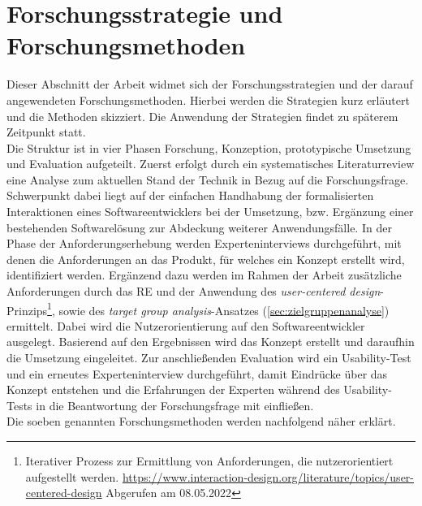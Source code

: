 \section{Forschungsstrategie und Forschungsmethoden}
\label{sec:forschungsstrategie}
    Dieser Abschnitt der Arbeit widmet sich der Forschungsstrategien und der darauf angewendeten Forschungsmethoden. 
    Hierbei werden die Strategien kurz erläutert und die Methoden skizziert. Die Anwendung der Strategien findet zu 
    späterem Zeitpunkt statt. 
    \\
    Die Struktur ist in vier Phasen Forschung, Konzeption, prototypische Umsetzung und Evaluation aufgeteilt. Zuerst erfolgt durch ein 
    systematisches Literaturreview eine Analyse zum aktuellen Stand der Technik in Bezug auf die Forschungsfrage. 
    Schwerpunkt dabei liegt auf der einfachen Handhabung der formalisierten 
    Interaktionen eines Softwareentwicklers bei der Umsetzung, bzw. Ergänzung einer bestehenden 
    Softwarelösung zur Abdeckung weiterer Anwendungsfälle. 
    In der Phase der Anforderungserhebung werden Experteninterviews durchgeführt, mit denen die Anforderungen an das Produkt, 
    für welches ein Konzept erstellt wird, identifiziert werden. Ergänzend dazu werden im Rahmen der Arbeit zusätzliche 
    Anforderungen durch das \ac{RE} und der Anwendung des \textit{user-centered design}-Prinzips\footnote{Iterativer Prozess zur Ermittlung von Anforderungen, die nutzerorientiert aufgestellt werden. \url{https://www.interaction-design.org/literature/topics/user-centered-design} Abgerufen am 08.05.2022}, 
    sowie des \textit{target group analysis}-Ansatzes (\ref{sec:zielgruppenanalyse}) ermittelt. Dabei wird die 
    Nutzerorientierung auf den Softwareentwickler ausgelegt. Basierend auf den Ergebnissen wird das Konzept erstellt und daraufhin die Umsetzung eingeleitet. 
    Zur anschließenden Evaluation wird ein Usability-Test und ein erneutes Experteninterview durchgeführt, damit 
    Eindrücke über das Konzept entstehen und die Erfahrungen der Experten während des Usability-Tests 
    in die Beantwortung der Forschungsfrage mit einfließen.
    \\
    Die soeben genannten Forschungsmethoden werden nachfolgend näher erklärt.

